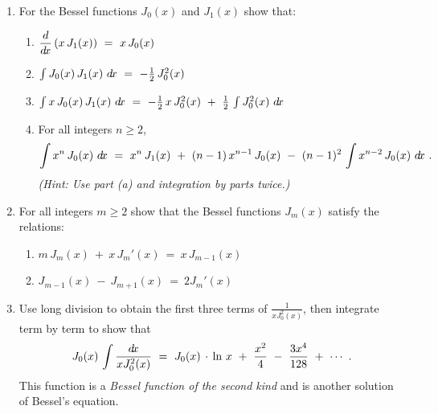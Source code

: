 {\begin{enumerate}[item-label={\bfseries \arabic*.}]
  (see equation(\ref{eqn:besseldiffeqgen})).
 \item\label{exer:besselderiv} For the Bessel functions $J_0(x)$ and $J_1(x)$
  show that:
\begin{enumerate}[item-label={\bfseries (\alph*)}]
\item $\dfrac{d}{d\!x}\,(x\,J_1(x)) ~=~ x\,J_0(x)$
\item $\int J_0(x)\,J_1(x)~d\!x ~=~ -\frac{1}{2}\,J_0^2(x)$
\item $\int x\,J_0(x)\,J_1(x)~d\!x ~=~ -\frac{1}{2}\,x\,J_0^2(x) ~+~
\frac{1}{2}\,\int J_0^2(x)~d\!x$
\item For all integers $n\ge 2$,
\[
\int x^n\,J_0(x)~d\!x ~=~ x^n\,J_1(x) ~+~ (n-1)\,x^{n-1}\,J_0(x) ~-~
(n-1)^2\,\int x^{n-2}\,J_0(x)~d\!x ~.
\]
\emph{(Hint: Use part (a) and integration by parts twice.)}
\end{enumerate}
 \item For all integers $m\ge 2$ show that the Bessel functions $J_m(x)$
  satisfy the relations:
\begin{enumerate}[item-label={\bfseries (\alph*)}]
\item $m\,J_m(x) ~+~ x\,J_m'(x) ~=~ x\,J_{m-1}(x)$
\item $J_{m-1}(x) ~-~ J_{m+1}(x) ~=~ 2J_{m}'(x)$
\end{enumerate}
 \item Use long division to obtain the first three terms of
  $\frac{1}{x J_0^2(x)}$, then integrate term by term to show that
\[
J_0(x)\,\int \frac{d\!x}{x J_0^2(x)} ~=~ J_0(x)\,\cdot\,\ln\,x ~+~ \frac{x^2}{4}
~-~ \frac{3x^4}{128} ~+~ \cdots ~.
\]
This function is a \emph{Bessel function of the second kind} and is another
solution of Bessel's equation.
\end{enumerate}
}
\newpage
